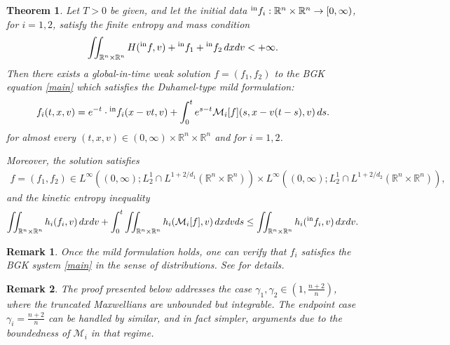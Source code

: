 \documentclass[10pt,reqno]{amsart}
\numberwithin{equation}{section}
\newtheorem{theorem}{Theorem}[section]
\newtheorem{remark}{Remark}[section]
\newcommand{\R}{\mathbb R}
\newcommand{\calM}{\mathcal M}
\begin{document}
\begin{theorem} \label{thm: exist}
    Let $T>0$ be given, and let the initial data ${}^{\rm in}f_i:\R^n \times \R^n\to [0,\infty)$, for $i=1,2$, satisfy the finite entropy and mass condition
    \begin{equation}\label{eq: hyp in}
        \iint_{\R^n \times \R^n} H({}^{\rm in}f,v) + {}^{\rm in}f_1 + {}^{\rm in}f_2 \, dxdv < +\infty.
    \end{equation}
    Then there exists a global-in-time weak solution $f = (f_1, f_2)$ to the BGK equation \eqref{main} which satisfies the Duhamel-type mild formulation:
    \begin{align*}
        f_i(t,x,v) = e^{-t} \cdot {}^{\rm in}f_i(x-vt,v) + \int_0^t e^{s-t} \calM_i[f](s,x-v(t-s),v)\,ds.
    \end{align*}
    for almost every $(t,x,v)\in (0,\infty)\times\R^n \times \R^n$ and for $i=1,2$.
    
    Moreover, the solution satisfies  
    \begin{align}\label{eq: prop f}
        f = (f_1, f_2) \in L^\infty((0,\infty);L^1_2 \cap L^{1+2/d_1} (\R^n \times \R^n)) \times L^\infty((0,\infty);L^1_2 \cap L^{1+2/d_2} (\R^n \times \R^n)),
    \end{align}
    and the kinetic entropy inequality
    \begin{align*}
        \iint_{\R^n \times \R^n} h_i(f_i,v)\,dxdv + \int_0^t \iint_{\R^n \times \R^n} h_i(\calM_i[f],v)\,dxdvds \le \iint_{\R^n \times \R^n} h_i({}^{\rm in}f_i,v)\,dxdv.
    \end{align*}
\end{theorem}
\begin{remark}
Once the mild formulation holds, one can verify that $f_i$ satisfies the BGK system \eqref{main} in the sense of distributions. See \cite[Appendix C]{KS24} for details.
\end{remark}

 

\begin{remark}
The proof presented below addresses the case $\gamma_1, \gamma_2 \in (1, \frac{n+2}{n})$, where the truncated Maxwellians are unbounded but integrable. The endpoint case $\gamma_i = \frac{n+2}{n}$ can be handled by similar, and in fact simpler, arguments due to the boundedness of $\mathcal{M}_i$ in that regime.
\end{remark}
%
%
%
%
%
%
%
%
%
%
%
%
%
\end{document}
